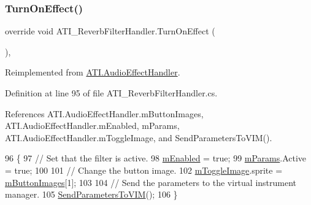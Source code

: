 \mbox{\label{class_a_t_i___reverb_filter_handler_aa25fcaa9c07d614b869334e1db14f7d6}} 
\subsubsection{\texorpdfstring{Turn\+On\+Effect()}{TurnOnEffect()}}
{\footnotesize\ttfamily override void A\+T\+I\+\_\+\+Reverb\+Filter\+Handler.\+Turn\+On\+Effect (\begin{DoxyParamCaption}{ }\end{DoxyParamCaption})\hspace{0.3cm}{\ttfamily [protected]}, {\ttfamily [virtual]}}



Reimplemented from \hyperlink{class_a_t_i_1_1_audio_effect_handler_abccfc2e809d0d6b643704f7391461cd7}{A\+T\+I.\+Audio\+Effect\+Handler}.



Definition at line 95 of file A\+T\+I\+\_\+\+Reverb\+Filter\+Handler.\+cs.



References A\+T\+I.\+Audio\+Effect\+Handler.\+m\+Button\+Images, A\+T\+I.\+Audio\+Effect\+Handler.\+m\+Enabled, m\+Params, A\+T\+I.\+Audio\+Effect\+Handler.\+m\+Toggle\+Image, and Send\+Parameters\+To\+V\+I\+M().


\begin{DoxyCode}
96     \{
97         \textcolor{comment}{// Set that the filter is active.}
98         \hyperlink{class_a_t_i_1_1_audio_effect_handler_a378c463b827ad6e41d09a4ec2caff351}{mEnabled} = \textcolor{keyword}{true};
99         \hyperlink{class_a_t_i___reverb_filter_handler_a034260fbce2052b42bceddc891632347}{mParams}.Active = \textcolor{keyword}{true};
100 
101         \textcolor{comment}{// Change the button image.}
102         \hyperlink{class_a_t_i_1_1_audio_effect_handler_aa5bf03976a14594f089aac5681c15a83}{mToggleImage}.sprite = \hyperlink{class_a_t_i_1_1_audio_effect_handler_a6e1cfd5449b82870eacd7404a158c7a7}{mButtonImages}[1];
103 
104         \textcolor{comment}{// Send the parameters to the virtual instrument manager.}
105         \hyperlink{class_a_t_i___reverb_filter_handler_aacb469dc3038fca616d638f6a5a04a30}{SendParametersToVIM}();
106     \}
\end{DoxyCode}



